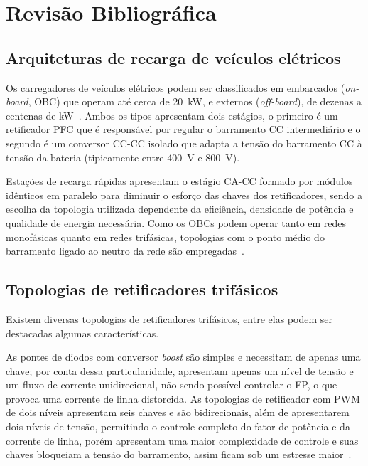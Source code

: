 \section{Revisão Bibliográfica}
\label{sec:revisao}

\subsection{Arquiteturas de recarga de veículos elétricos}
Os carregadores de veículos elétricos podem ser classificados em embarcados (\textit{on-board}, OBC) que operam até cerca de \SI{20}{kW}, e externos (\textit{off-board}),
de dezenas a centenas de kW~\cite{yilmaz2013review,tu2019extreme}. Ambos os tipos
apresentam dois estágios, o primeiro é um retificador PFC que é responsável por regular 
o barramento CC intermediário e o segundo é um conversor CC-CC isolado que adapta a tensão do barramento CC à tensão da bateria (tipicamente entre \SI{400}{V} e \SI{800}{V}). 

Estações de recarga rápidas apresentam o estágio CA-CC formado por módulos idênticos em paralelo para diminuir o esforço das chaves dos retificadores, sendo a escolha da 
topologia utilizada dependente da eficiência, densidade de potência e qualidade de energia necessária. Como os 
OBCs podem operar tanto em redes monofásicas quanto em redes trifásicas, topologias com
o ponto médio do barramento ligado ao neutro da rede são empregadas~\cite{schafmeister2021transformerless}.

\subsection{Topologias de retificadores trifásicos}

Existem diversas topologias de retificadores trifásicos, entre elas podem ser destacadas algumas características. 

As pontes de diodos com conversor \textit{boost} são simples e necessitam de apenas uma chave; por conta dessa particularidade, apresentam
apenas um nível de tensão e um fluxo de corrente unidirecional, não sendo possível controlar o FP, o que provoca
uma corrente de linha distorcida. As topologias de retificador com PWM de dois níveis apresentam seis chaves e são bidirecionais, além de apresentarem
dois níveis de tensão, permitindo o controle completo do fator de potência e da corrente de linha, porém apresentam uma maior complexidade de controle e suas chaves bloqueiam a tensão do barramento, assim ficam sob um estresse maior~\cite{kolar2013essence}. 

